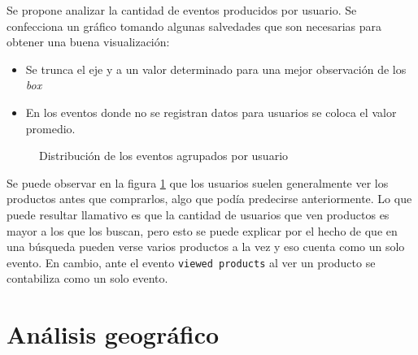 \documentclass[a4paper]{article}
\begin{document}
Se propone analizar la cantidad de eventos producidos por usuario. Se confecciona un gráfico tomando algunas salvedades que son necesarias para obtener una buena visualización:

\begin{itemize}
	\item Se trunca el eje y a un valor determinado para una mejor observación de los \textit{box}
	\item En los eventos donde no se registran datos para usuarios se coloca el valor promedio.
\end{itemize}


\begin{figure}[h!]
	\caption{Distribución de los eventos agrupados por usuario}
	\label{fig:boxplot}
\end{figure}

Se puede observar en la figura \ref{fig:boxplot} que los usuarios suelen generalmente ver los productos antes que comprarlos, algo que podía predecirse anteriormente. Lo que puede resultar llamativo es que la cantidad de usuarios que ven productos es mayor a los que los buscan, pero esto se puede explicar por el hecho de que en una búsqueda pueden verse varios productos a la vez y eso cuenta como un solo evento. En cambio, ante el evento \texttt{viewed products} al ver un producto se contabiliza como un solo evento.

\section{Análisis geográfico}
\end{document}
